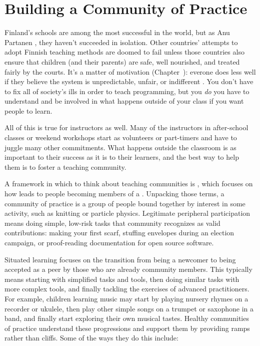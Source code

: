 \chapter{Building a Community of Practice}\label{s:community}

Finland's schools are among the most successful in the world,
but as Anu Partanen ,
they haven't succeeded in isolation.
Other countries' attempts to adopt Finnish teaching methods are doomed to fail
unless those countries also ensure that children (and their parents) are safe,
well nourished,
and treated fairly by the courts.
It's a matter of motivation (Chapter~\cite{s:motivation}):
everone does less well
if they believe the system is unpredictable, unfair, or indifferent \cite{Sahl2015,Wilk2011}.
You don't have to fix all of society's ills in order to teach programming,
but you \emph{do} you have to understand and be involved in
what happens outside of your class if you want people to learn.

All of this is true for instructors as well.
Many of the instructors in after-school classes or weekend workshops
start as volunteers or part-timers
and have to juggle many other commitments.
What happens outside the classroom is as important to their success
as it is to their learners,
and the best way to help them is to foster a teaching community.

A framework in which to think about teaching communities is ,
which focuses on how 
leads to people becoming members of
a  \cite{Weng2015}.
Unpacking those terms,
a community of practice is a group of people bound together by interest in some activity,
such as knitting or particle physics.
Legitimate peripheral participation means doing simple, low-risk tasks
that community recognizes as valid contributions:
making your first scarf,
stuffing envelopes during an election campaign,
or proof-reading documentation for open source software.

Situated learning focuses on the transition from being a newcomer
to being accepted as a peer by those who are already community members.
This typically means starting with simplified tasks and tools,
then doing similar tasks with more complex tools,
and finally tackling the exercises of advanced practitioners.
For example,
children learning music may start by playing nursery rhymes on a recorder or ukulele,
then play other simple songs on a trumpet or saxophone in a band,
and finally start exploring their own musical tastes.
Healthy communities of practice understand these progressions
and support them by providing ramps rather than cliffs.
Some of the ways they do this include:

